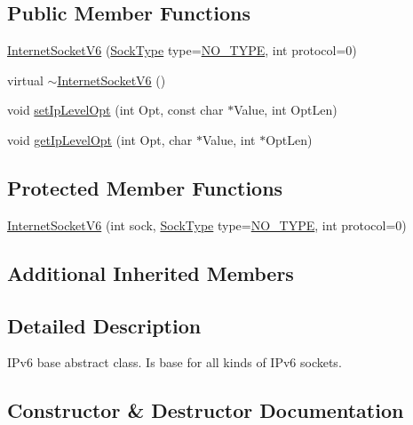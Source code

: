\subsection*{Public Member Functions}
\begin{DoxyCompactItemize}
\item 
\hyperlink{classInternetSocketV6_a9be445b17d5fc20a56c95a129f4e3bfd}{Internet\+Socket\+V6} (\hyperlink{classSocketClass_a2182dd9fee09459fabb99e6ae717f595}{Sock\+Type} type=\hyperlink{classSocketClass_a2182dd9fee09459fabb99e6ae717f595a8c7f955ea5b71498ff1d469345d813ad}{N\+O\+\_\+\+T\+Y\+PE}, int protocol=0)
\item 
virtual \hyperlink{classInternetSocketV6_aa91c9ad4f01dd5c7a305cc868d46af2c}{$\sim$\+Internet\+Socket\+V6} ()
\item 
void \hyperlink{classInternetSocketV6_a6150f7fdce307a1b4dd0adf20cafbc54}{set\+Ip\+Level\+Opt} (int Opt, const char $\ast$Value, int Opt\+Len)
\item 
void \hyperlink{classInternetSocketV6_a455f355f674add52641d4713c42f8f6b}{get\+Ip\+Level\+Opt} (int Opt, char $\ast$Value, int $\ast$Opt\+Len)
\end{DoxyCompactItemize}
\subsection*{Protected Member Functions}
\begin{DoxyCompactItemize}
\item 
\hyperlink{classInternetSocketV6_a30243b27e0d83abaacd9c8c170fd684b}{Internet\+Socket\+V6} (int sock, \hyperlink{classSocketClass_a2182dd9fee09459fabb99e6ae717f595}{Sock\+Type} type=\hyperlink{classSocketClass_a2182dd9fee09459fabb99e6ae717f595a8c7f955ea5b71498ff1d469345d813ad}{N\+O\+\_\+\+T\+Y\+PE}, int protocol=0)
\end{DoxyCompactItemize}
\subsection*{Additional Inherited Members}


\subsection{Detailed Description}
I\+Pv6 base abstract class. Is base for all kinds of I\+Pv6 sockets. 

\subsection{Constructor \& Destructor Documentation}
\mbox{\label{classInternetSocketV6_a9be445b17d5fc20a56c95a129f4e3bfd}} 
